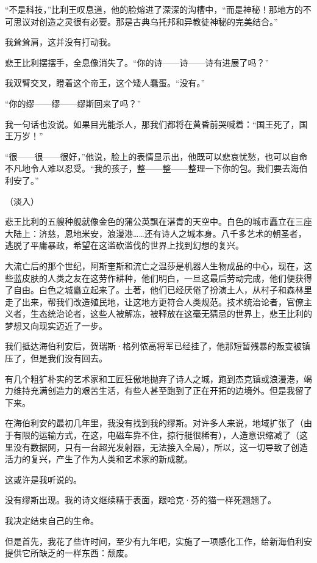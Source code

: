 \documentclass[AutoFakeBold=true]{book}
\begin{document}
``不是科技，''比利王叹息道，他的脸熔进了深深的沟槽中，``而是神秘！那地方的不可思议对创造之灵很有必要。那是古典乌托邦和异教徒神秘的完美结合。''

我耸耸肩，这并没有打动我。

悲王比利摆摆手，全息像消失了。``你的诗——诗——诗有进展了吗？''

我双臂交叉，瞪着这个帝王，这个矮人蠢蛋。``没有。''

``你的缪——缪——缪斯回来了吗？''

我一句话也没说。如果目光能杀人，那我们都将在黄昏前哭喊着：``国王死了，国王万岁！''

``很——很——很好，''他说，脸上的表情显示出，他既可以悲哀忧愁，也可以自命不凡地令人难以忍受。``我的孩子，整——整——整理一下你的包。我们要去海伯利安了。''

\vspace*{1em}

（淡入）

悲王比利的五艘种舰就像金色的蒲公英飘在湛青的天空中。白色的城市矗立在三座大陆上：济慈，恩地米安，浪漫港……还有诗人之城本身。八千多艺术的朝圣者，逃脱了平庸暴政，希望在这滥砍滥伐的世界上找到幻想的复兴。

大流亡后的那个世纪，阿斯奎斯和流亡之温莎是机器人生物成品的中心，现在，这些蓝皮肤的人类之友在这劳作耕种，他们明白，一旦这最后劳动完成，他们便获得了自由。白色之城矗立起来了。土著，他们已经厌倦了扮演土人，从村子和森林里走了出来，帮我们改造殖民地，让这地方更符合人类规范。技术统治论者，官僚主义者，生态统治论者，这些人被解冻，被释放在这毫无猜忌的世界上，悲王比利的梦想又向现实迈近了一步。

我们抵达海伯利安后，贺瑞斯·格列侬高将军已经挂了，他那短暂残暴的叛变被镇压了，但是我们没有回去。

有几个粗犷朴实的艺术家和工匠狂傲地抛弃了诗人之城，跑到杰克镇或浪漫港，竭力维持充满创造力的艰苦生活，有些人甚至跑到了正在开拓的边境外。但是我留了下来。

在海伯利安的最初几年里，我没有找到我的缪斯。对许多人来说，地域扩张了（由于有限的运输方式，在这，电磁车靠不住，掠行艇很稀有），人造意识缩减了（这里没有数据网，只有一台超光发射器，无法接入全局），所以，这一切导致了创造活力的复兴，产生了作为人类和艺术家的新成就。

这或许是我听说的。

没有缪斯出现。我的诗文继续精于表面，跟哈克·芬的猫一样死翘翘了。

我决定结束自己的生命。

但是首先，我花了些许时间，至少有九年吧，实施了一项感化工作，给新海伯利安提供它所缺乏的一样东西：颓废。
\end{document}
